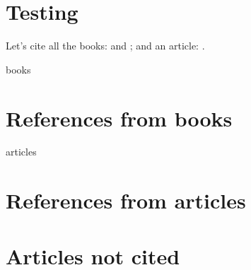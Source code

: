 \documentclass[10pt]{article}
\begin{document}


\section{Testing}
Let's cite all the books: \cite{ColBenh:93} and
\cite{Munt:93}; and an article: \cite{RouxSmart:95}.

\begin{btSect}{books}
\section{References from books}
\btPrintCited
\end{btSect}

\begin{btSect}[plain]{articles}
\section{References from articles}
\btPrintCited

\section{Articles not cited}
\btPrintNotCited
\end{btSect}
\end{document}
